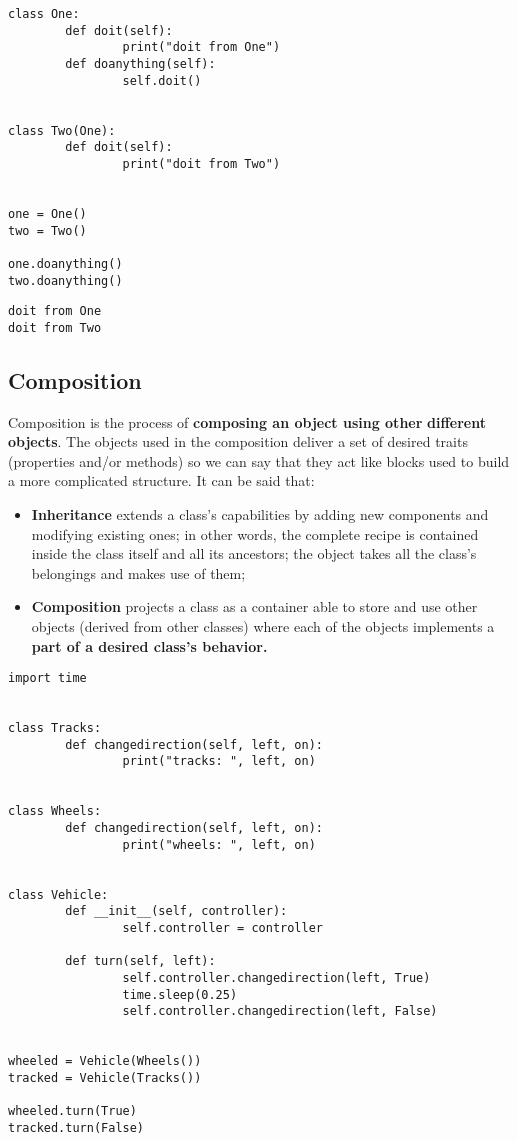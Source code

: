 \documentclass[11pt]{article}
\begin{document}
\begin{verbatim}
class One:
        def doit(self):
                print("doit from One")
        def doanything(self):
                self.doit()


class Two(One):
        def doit(self):
                print("doit from Two")


one = One()
two = Two()

one.doanything()
two.doanything()
\end{verbatim}

\begin{verbatim}
doit from One
doit from Two
\end{verbatim}
\subsection{Composition}
\label{sec:org3ae2929}
Composition is the process of \textbf{composing an object using other}
\textbf{different objects}. The objects used in the composition deliver a set
of desired traits (properties and/or methods) so we can say that they
act like blocks used to build a more complicated structure.
It can be said that:

\begin{itemize}
\item \textbf{Inheritance} extends a class’s capabilities by adding new
components and modifying existing ones; in other words, the complete
recipe is contained inside the class itself and all its ancestors;
the object takes all the class’s belongings and makes use of them;
\item \textbf{Composition} projects a class as a container able to store and use
other objects (derived from other classes) where each of the objects
implements a \textbf{part of a desired class’s behavior.}
\end{itemize}

\begin{verbatim}
import time


class Tracks:
        def changedirection(self, left, on):
                print("tracks: ", left, on)


class Wheels:
        def changedirection(self, left, on):
                print("wheels: ", left, on)


class Vehicle:
        def __init__(self, controller):
                self.controller = controller

        def turn(self, left):
                self.controller.changedirection(left, True)
                time.sleep(0.25)
                self.controller.changedirection(left, False)


wheeled = Vehicle(Wheels())
tracked = Vehicle(Tracks())

wheeled.turn(True)
tracked.turn(False)

\end{verbatim}
\end{document}

